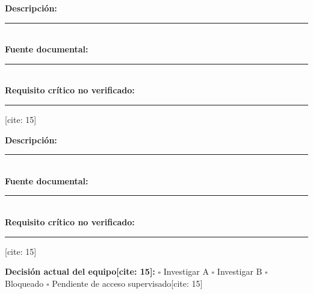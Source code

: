 \documentclass[10pt, a4paper, landscape]{article}
\begin{document}
\vspace{0.2cm}
\noindent
\begin{minipage}[t]{0.49\textwidth}
    \begin{tcolorbox}[colback=white, colframe=ucbblue, title=\textbf{Hipótesis de Arquitectura A} {[cite: 15]}, left=2mm, right=2mm, top=1mm, bottom=1mm]
        \footnotesize
        \textbf{Descripción:} \rule{8.5cm}{0.15mm}\\[0.25cm]
        \textbf{Fuente documental:} \rule{7.3cm}{0.15mm}\\[0.25cm]
        \textbf{Requisito crítico no verificado:} \rule{5.6cm}{0.15mm}[cite: 15]
    \end{tcolorbox}
\end{minipage}%
\hfill
\begin{minipage}[t]{0.49\textwidth}
    \begin{tcolorbox}[colback=white, colframe=ucbblue, title=\textbf{Hipótesis de Arquitectura B} {[cite: 15]}, left=2mm, right=2mm, top=1mm, bottom=1mm]
        \footnotesize
        \textbf{Descripción:} \rule{8.5cm}{0.15mm}\\[0.25cm]
        \textbf{Fuente documental:} \rule{7.3cm}{0.15mm}\\[0.25cm]
        \textbf{Requisito crítico no verificado:} \rule{5.6cm}{0.15mm}[cite: 15]
    \end{tcolorbox}
\end{minipage}

\vspace{0.2cm}
\noindent
\textbf{Decisión actual del equipo[cite: 15]:} \quad
$\square$ Investigar A \qquad
$\square$ Investigar B \qquad
$\square$ Bloqueado \qquad
$\square$ Pendiente de acceso supervisado[cite: 15]
\end{document}
